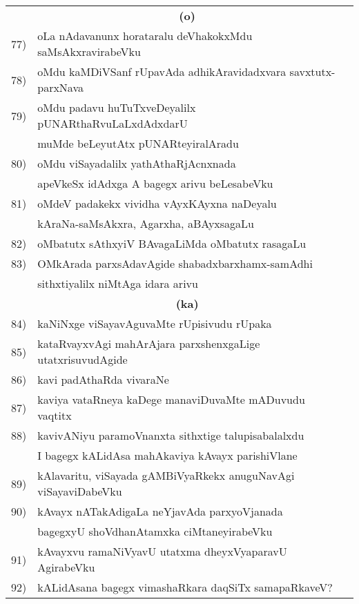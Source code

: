 {\begin{longtable}{@{}cp{7.4cm}r}
    &  \multicolumn{1}{c}{\bf(o)} & \\[0.3cm]  
77) & oLa nAdavanunx horataralu deVhakokxMdu saMsAkxravirabeVku &  \pageref{page130}\\
78) & oMdu kaMDiVSanf rUpavAda adhikAravidadxvara savxtutx-parxNava & \pageref{page140}\\
79) & oMdu padavu huTuTxveDeyalilx pUNARthaRvuLaLxdAdxdarU  & \\ 
    & muMde beLeyutAtx pUNARteyiralAradu &  \pageref{page177}\\
80) & oMdu viSayadalilx yathAthaRjAcnxnada  & \\
    & apeVkeSx idAdxga A bagegx arivu beLesabeVku &  \pageref{page200}\\
81) & oMdeV padakekx vividha vAyxKAyxna naDeyalu  & \\
    & kAraNa-saMsAkxra, Agarxha, aBAyxsagaLu  & \pageref{page212}\\ 
82) & oMbatutx sAthxyiV BAvagaLiMda oMbatutx rasagaLu & \pageref{page230}\\ 
83) & OMkArada parxsAdavAgide shabadxbarxhamx-samAdhi & \\
    & sithxtiyalilx niMtAga idara arivu & \pageref{page203}\\
    &  \multicolumn{1}{c}{\bf(ka)} & \\[0.3cm]
84) & kaNiNxge viSayavAguvaMte rUpisivudu rUpaka & \pageref{page241}\\
85) & kataRvayxvAgi mahArAjara parxshenxgaLige utatxrisuvudAgide & \pageref{page250}\\
86)  & kavi padAthaRda vivaraNe & \pageref{page184}\\
87) & kaviya vataRneya kaDege manaviDuvaMte mADuvudu vaqtitx & \pageref{page245}\\
88) & kavivANiyu paramoVnanxta sithxtige talupisabalalxdu & \\
    & I bagegx kALidAsa mahAkaviya kAvayx parishiVlane & \pageref{page232}\\    
89) & kAlavaritu, viSayada gAMBiVyaRkekx anuguNavAgi viSayaviDabeVku & \pageref{page250}\\
90) & kAvayx nATakAdigaLa neYjavAda parxyoVjanada   & \\
    & bagegxyU shoVdhanAtamxka ciMtaneyirabeVku & \pageref{page233} \\
91) & kAvayxvu ramaNiVyavU utatxma dheyxVyaparavU AgirabeVku & \pageref{page244}\\
92) & kALidAsana bagegx vimashaRkara daqSiTx samapaRkaveV? & \pageref{page233} \\

\end{longtable}}
